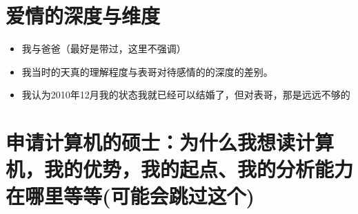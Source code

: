 \documentclass[9pt, b5paper]{article}
\begin{document}
\section{爱情的深度与维度}
\label{sec:org580881b}
\begin{itemize}
\item 我与爸爸（最好是带过，这里不强调）
\item 我当时的天真的理解程度与表哥对待感情的的深度的差别。
\item 我认为2010年12月我的状态我就已经可以结婚了，但对表哥，那是远远不够的
\end{itemize}
\section{申请计算机的硕士：为什么我想读计算机，我的优势，我的起点、我的分析能力在哪里等等(可能会跳过这个)}
\label{sec:orga1669c9}
\end{document}

